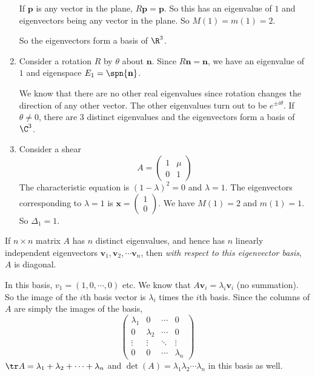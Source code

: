 \documentclass[a4paper]{article}
\begin{document}
\begin{eg}
\begin{enumerate}
            If $\mathbf{p}$ is any vector in the plane, $R\mathbf{p} = \mathbf{p}$. So this has an eigenvalue of $1$ and eigenvectors being any vector in the plane. So $M(1) = m(1) = 2$.

            So the eigenvectors form a basis of $\R^3$.
          \item Consider a rotation $R$ by $\theta$ about $\mathbf{n}$. Since $R\mathbf{n} = \mathbf{n}$, we have an eigenvalue of $1$ and eigenspace $E_1 = \spn\{\mathbf{n}\}$.

            We know that there are no other real eigenvalues since rotation changes the direction of any other vector. The other eigenvalues turn out to be $e^{\pm i\theta}$. If $\theta \not= 0$, there are 3 distinct eigenvalues and the eigenvectors form a basis of $\C^3$.
          \item Consider a shear
            \[
              A = 
              \begin{pmatrix}
                1&\mu\\0&1
              \end{pmatrix}
            \]
            The characteristic equation is $(1 - \lambda)^2 = 0$ and $\lambda = 1$. The eigenvectors corresponding to $\lambda = 1$ is $\mathbf{x} = 
            \begin{pmatrix}
              1\\0
            \end{pmatrix}$. We have $M(1) = 2$ and $m(1) = 1$. So $\Delta_1 = 1$.
        \end{enumerate}
      \end{eg}
      \note If $n\times n$ matrix $A$ has $n$ distinct eigenvalues, and hence has $n$ linearly independent eigenvectors $\mathbf{v}_1, \mathbf{v}_2, \cdots \mathbf{v}_n$, then \emph{with respect to this eigenvector basis}, $A$ is diagonal.

      In this basis, $v_1 = (1, 0, \cdots, 0)$ etc. We know that $A\mathbf{v}_i = \lambda_i\mathbf{v}_i$ (no summation). So the image of the $i$th basis vector is $\lambda_i$ times the $i$th basis. Since the columns of $A$ are simply the images of the basis,
      \[
        \begin{pmatrix}
          \lambda_1 & 0 & \cdots & 0\\
          0 & \lambda_2 & \cdots & 0\\
          \vdots & \vdots & \ddots & \vdots\\
          0 & 0 & \cdots & \lambda_n
        \end{pmatrix}
      \]
      \note $\tr A = \lambda_1 + \lambda_2 + \cdots + \lambda_n$ and $\det(A) = \lambda_1\lambda_2\cdots \lambda_n$ in this basis as well.
\end{document}
